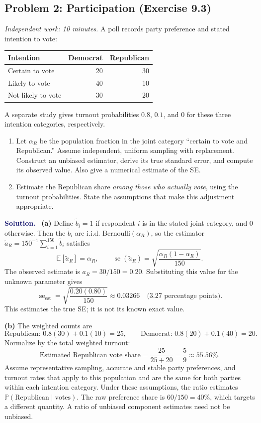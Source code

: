 \documentclass[11pt]{article}
\newcommand{\Pbb}{\mathbb{P}}
\newcommand{\E}{\mathbb{E}}
\newcommand{\se}{\operatorname{se}}
\newcommand{\rv}[1]{\widetilde{#1}}
\newenvironment{answer}{%
    \par\medskip\noindent\textcolor{MidnightBlue}{\textbf{Solution.}}\ }
    {\par\medskip}
\newcommand{\workingspace}[1]{}
\newcommand{\workingspace}[1]{\vspace{#1}}
\begin{document}
\newpage
\subsection*{Problem 2: Participation (Exercise 9.3)}
\noindent\textit{Independent work: 10 minutes.}
A poll records party preference and stated intention to vote:
\begin{center}
\begin{tabular}{@{}lrr@{}}
\toprule
Intention & Democrat & Republican\\
\midrule
Certain to vote & 20 & 30\\
Likely to vote & 40 & 10\\
Not likely to vote & 30 & 20\\
\bottomrule
\end{tabular}
\end{center}
A separate study gives turnout probabilities $0.8$, $0.1$, and $0$ for
these three intention categories, respectively.
\begin{enumerate}
  \item Let $\alpha_R$ be the population fraction in the joint category
    ``certain to vote and Republican.'' Assume independent, uniform
    sampling with replacement. Construct an unbiased estimator,
    derive its true standard error, and compute its observed value.
    Also give a numerical estimate of the SE.
  \item Estimate the Republican share \emph{among those who actually
    vote}, using the turnout probabilities. State the assumptions that
    make this adjustment appropriate.
\end{enumerate}
\workingspace{9cm}

\begin{answer}
\textbf{(a)} Define $\rv{b}_i=1$ if respondent $i$ is in the stated
joint category, and $0$ otherwise. Then the $\rv{b}_i$ are i.i.d.
Bernoulli$(\alpha_R)$, so the estimator
$\rv{a}_R=150^{-1}\sum_{i=1}^{150}\rv{b}_i$ satisfies
\[
  \E[\rv{a}_R]=\alpha_R,\qquad
  \boxed{\se(\rv{a}_R)=\sqrt{\frac{\alpha_R(1-\alpha_R)}{150}}.}
\]
The observed estimate is $a_R=30/150=\boxed{0.20}$. Substituting this
value for the unknown parameter gives
\[
  \se_{\mathrm{est}}=\sqrt{\frac{0.20(0.80)}{150}}
     \approx\boxed{0.03266}\quad\text{(3.27 percentage points).}
\]
This estimates the true SE; it is not its known exact value.

\textbf{(b)} The weighted counts are
\[
  \text{Republican: }0.8(30)+0.1(10)=25,\qquad
  \text{Democrat: }0.8(20)+0.1(40)=20.
\]
Normalize by the total weighted turnout:
\[
  \boxed{\text{Estimated Republican vote share}
    =\frac{25}{25+20}=\frac59\approx55.56\%.}
\]
Assume representative sampling, accurate and stable party preferences,
and turnout rates that apply to this population and are the same for both
parties within each intention category. Under these assumptions, the
ratio estimates $\Pbb(\text{Republican}\mid\text{votes})$.
The raw preference share is $60/150=40\%$, which targets a different
quantity. A ratio of unbiased component estimates need not be unbiased.
\end{answer}
\end{document}
